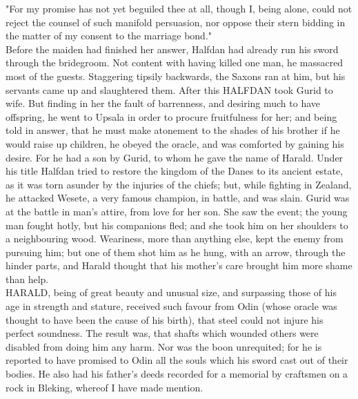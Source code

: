 \documentclass[10pt,a4paper]{report}
\begin{document}
"For my promise has not yet beguiled thee at all, though I, being alone, could not reject the counsel of such manifold persuasion, nor oppose their stern bidding in the matter of my consent to the marriage bond."\\

Before the maiden had finished her answer, Halfdan had already run his sword through the bridegroom. Not content with having killed one man, he massacred most of the guests. Staggering tipsily backwards, the Saxons ran at him, but his servants came up and slaughtered them. After this HALFDAN took Gurid to wife. But finding in her the fault of barrenness, and desiring much to have offspring, he went to Upsala in order to procure fruitfulness for her; and being told in answer, that he must make atonement to the shades of his brother if he would raise up children, he obeyed the oracle, and was comforted by gaining his desire. For he had a son by Gurid, to whom he gave the name of Harald. Under his title Halfdan tried to restore the kingdom of the Danes to its ancient estate, as it was torn asunder by the injuries of the chiefs; but, while fighting in Zealand, he attacked Wesete, a very famous champion, in battle, and was slain. Gurid was at the battle in man's attire, from love for her son. She saw the event; the young man fought hotly, but his companions fled; and she took him on her shoulders to a neighbouring wood. Weariness, more than anything else, kept the enemy from pursuing him; but one of them shot him as he hung, with an arrow, through the hinder parts, and Harald thought that his mother's care brought him more shame than help.\\

HARALD, being of great beauty and unusual size, and surpassing those of his age in strength and stature, received such favour from Odin (whose oracle was thought to have been the cause of his birth), that steel could not injure his perfect soundness. The result was, that shafts which wounded others were disabled from doing him any harm. Nor was the boon unrequited; for he is reported to have promised to Odin all the souls which his sword cast out of their bodies. He also had his father's deeds recorded for a memorial by craftsmen on a rock in Bleking, whereof I have made mention.\\
\end{document}
